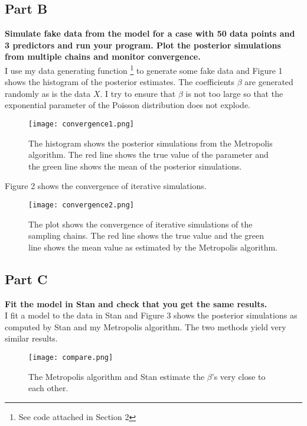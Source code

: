 \documentclass{article}
\begin{document}
\subsection{Part B}
\textbf{Simulate fake data from the model for a case with 50 data points and 3 predictors and run your program. Plot the posterior simulations from multiple chains and monitor convergence.}\\
I use my data generating function \footnote{See code attached in Section 2} to generate some fake data and Figure 1 shows the histogram of the posterior estimates. The coefficients $\beta$ are generated randomly as is the data $X$. I try to ensure that $\beta$ is not too large so that the exponential parameter of the Poisson distribution does not explode.
 \begin{figure}[H]
\centering
\texttt{[image: convergence1.png]}
\caption{The histogram shows the posterior simulations from the Metropolis algorithm. The red line shows the true value of the parameter and the green line shows the mean of the posterior simulations.}
\label{deltat}
\end{figure}
Figure 2 shows the convergence of iterative simulations. 
 \begin{figure}[H]
\centering
\texttt{[image: convergence2.png]}
\caption{The plot shows the convergence of iterative simulations of the sampling chains. The red line shows the true value and the green line shows the mean value as estimated by the Metropolis algorithm.}
\label{deltat}
\end{figure}

\subsection{Part C}
\textbf{Fit the model in Stan and check that you get the same results.}\\
I fit a model to the data in Stan and Figure 3 shows the posterior simulations as computed by Stan and my Metropolis algorithm. The two methods yield very similar results.
 \begin{figure}[H]
\centering
\texttt{[image: compare.png]}
\caption{The Metropolis algorithm and Stan estimate the $\beta$'s very close to each other.}
\label{deltat}
\end{figure}
\end{document}
